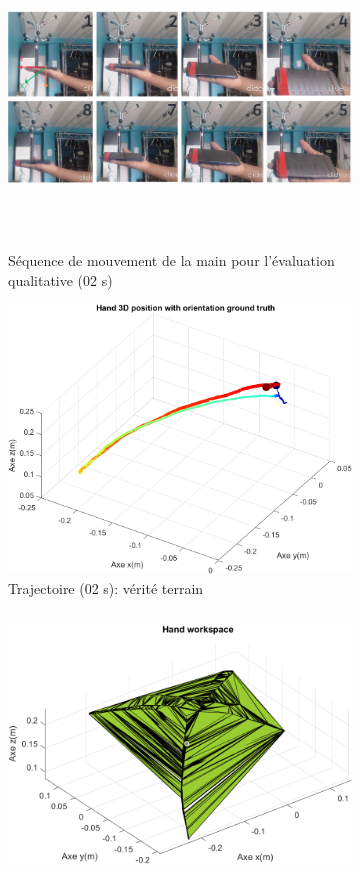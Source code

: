 \documentclass[8pt]{article}
\begin{document}
\begin{figure}[H]
\begin{subfigure}{1\textwidth}
        \centering
        \includegraphics[width=\linewidth, height=8cm]{../results/gt.png}
        \caption{Séquence de mouvement de la main pour l'évaluation qualitative (02 s)}
        \label{fig:img_mvt}
    \end{subfigure}
\begin{subfigure}{0.5\textwidth}
        \centering
        \includegraphics[width=\linewidth]{../results/mvt_1_3d.png}
        \caption{Trajectoire (02 s): vérité terrain }
        \label{subfig:traj_gt}
    \end{subfigure}
    \begin{subfigure}{0.5\textwidth}
        \centering
        \includegraphics[width=\linewidth, height=7cm]{../results/workspace_ref_min.png}

\end{subfigure}
\end{figure}
\end{document}
